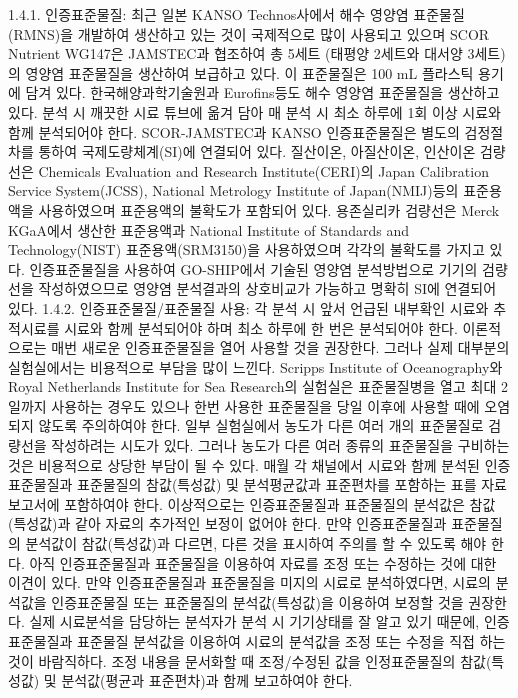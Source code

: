 \documentclass[
]{book}
\begin{document}
1.4.1. 인증표준물질: 최근 일본 KANSO Technos사에서 해수 영양염 표준물질(RMNS)을 개발하여 생산하고 있는 것이 국제적으로 많이 사용되고 있으며 SCOR Nutrient WG147은 JAMSTEC과 협조하여 총 5세트 (태평양 2세트와 대서양 3세트)의 영양염 표준물질을 생산하여 보급하고 있다. 이 표준물질은 100 mL 플라스틱 용기에 담겨 있다. 한국해양과학기술원과 Eurofins등도 해수 영양염 표준물질을 생산하고 있다. 분석 시 깨끗한 시료 튜브에 옮겨 담아 매 분석 시 최소 하루에 1회 이상 시료와 함께 분석되어야 한다. SCOR-JAMSTEC과 KANSO 인증표준물질은 별도의 검정절차를 통하여 국제도량체계(SI)에 연결되어 있다. 질산이온, 아질산이온, 인산이온 검량선은 Chemicals Evaluation and Research Institute(CERI)의 Japan Calibration Service System(JCSS), National Metrology Institute of Japan(NMIJ)등의 표준용액을 사용하였으며 표준용액의 불확도가 포함되어 있다. 용존실리카 검량선은 Merck KGaA에서 생산한 표준용액과 National Institute of Standards and Technology(NIST) 표준용액(SRM3150)을 사용하였으며 각각의 불확도를 가지고 있다. 인증표준물질을 사용하여 GO-SHIP에서 기술된 영양염 분석방법으로 기기의 검량선을 작성하였으므로 영양염 분석결과의 상호비교가 가능하고 명확히 SI에 연결되어 있다.
1.4.2. 인증표준물질/표준물질 사용: 각 분석 시 앞서 언급된 내부확인 시료와 추적시료를 시료와 함께 분석되어야 하며 최소 하루에 한 번은 분석되어야 한다. 이론적으로는 매번 새로운 인증표준물질을 열어 사용할 것을 권장한다. 그러나 실제 대부분의 실험실에서는 비용적으로 부담을 많이 느낀다. Scripps Institute of Oceanography와 Royal Netherlands Institute for Sea Research의 실험실은 표준물질병을 열고 최대 2일까지 사용하는 경우도 있으나 한번 사용한 표준물질을 당일 이후에 사용할 때에 오염되지 않도록 주의하여야 한다.
일부 실험실에서 농도가 다른 여러 개의 표준물질로 검량선을 작성하려는 시도가 있다. 그러나 농도가 다른 여러 종류의 표준물질을 구비하는 것은 비용적으로 상당한 부담이 될 수 있다. 매월 각 채널에서 시료와 함께 분석된 인증표준물질과 표준물질의 참값(특성값) 및 분석평균값과 표준편차를 포함하는 표를 자료보고서에 포함하여야 한다. 이상적으로는 인증표준물질과 표준물질의 분석값은 참값(특성값)과 같아 자료의 추가적인 보정이 없어야 한다. 만약 인증표준물질과 표준물질의 분석값이 참값(특성값)과 다르면, 다른 것을 표시하여 주의를 할 수 있도록 해야 한다. 아직 인증표준물질과 표준물질을 이용하여 자료를 조정 또는 수정하는 것에 대한 이견이 있다. 만약 인증표준물질과 표준물질을 미지의 시료로 분석하였다면, 시료의 분석값을 인증표준물질 또는 표준물질의 분석값(특성값)을 이용하여 보정할 것을 권장한다. 실제 시료분석을 담당하는 분석자가 분석 시 기기상태를 잘 알고 있기 때문에, 인증표준물질과 표준물질 분석값을 이용하여 시료의 분석값을 조정 또는 수정을 직접 하는 것이 바람직하다. 조정 내용을 문서화할 때 조정/수정된 값을 인정표준물질의 참값(특성값) 및 분석값(평균과 표준편차)과 함께 보고하여야 한다.
\end{document}
